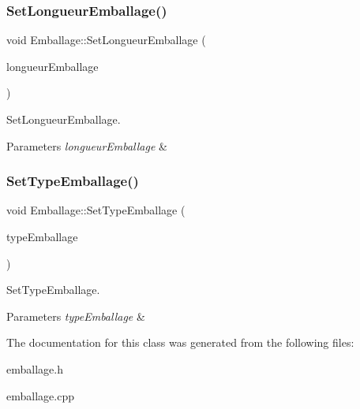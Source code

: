 \subsubsection{\texorpdfstring{Set\+Longueur\+Emballage()}{SetLongueurEmballage()}}
{\footnotesize\ttfamily void Emballage\+::\+Set\+Longueur\+Emballage (\begin{DoxyParamCaption}\item[{int}]{longueur\+Emballage }\end{DoxyParamCaption})}



Set\+Longueur\+Emballage. 


\begin{DoxyParams}{Parameters}
{\em longueur\+Emballage} & \\
\hline
\end{DoxyParams}
\mbox{\label{class_emballage_af26f49fa86f70ec4bbb5eaca71865570}} 
\subsubsection{\texorpdfstring{Set\+Type\+Emballage()}{SetTypeEmballage()}}
{\footnotesize\ttfamily void Emballage\+::\+Set\+Type\+Emballage (\begin{DoxyParamCaption}\item[{Q\+String}]{type\+Emballage }\end{DoxyParamCaption})}



Set\+Type\+Emballage. 


\begin{DoxyParams}{Parameters}
{\em type\+Emballage} & \\
\hline
\end{DoxyParams}


The documentation for this class was generated from the following files\+:\begin{DoxyCompactItemize}
\item 
emballage.\+h\item 
emballage.\+cpp\end{DoxyCompactItemize}
